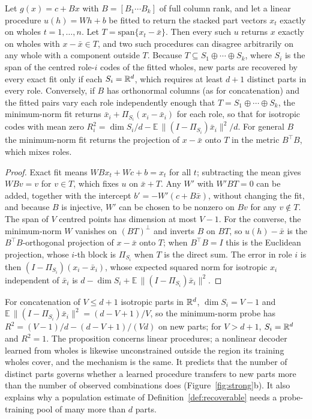\begin{proposition}
\label{prop:span}
Let $g(x) = c + Bx$ with $B = [B_1 \cdots B_k]$ of full column rank, and let a linear procedure $u(h) = Wh + b$ be fitted to return the stacked part vectors $x_t$ exactly on wholes $t = 1, \ldots, n$. Let $T = \mathrm{span}\{x_t - \bar{x}\}$. Then every such $u$ returns $x$ exactly on wholes with $x - \bar{x} \in T$, and two such procedures can disagree arbitrarily on any whole with a component outside $T$. Because $T \subseteq S_1 \oplus \cdots \oplus S_k$, where $S_i$ is the span of the centred role-$i$ codes of the fitted wholes, new parts are recovered by every exact fit only if each $S_i = \mathbb{R}^d$, which requires at least $d + 1$ distinct parts in every role. Conversely, if $B$ has orthonormal columns (as for concatenation) and the fitted pairs vary each role independently enough that $T = S_1 \oplus \cdots \oplus S_k$, the minimum-norm fit returns $\bar{x}_i + \Pi_{S_i}(x_i - \bar{x}_i)$ for each role, so that for isotropic codes with mean zero $R^2_i = \dim S_i/d - \mathbb{E}\,\lVert (I - \Pi_{S_i})\bar{x}_i \rVert^2/d$. For general $B$ the minimum-norm fit returns the projection of $x - \bar{x}$ onto $T$ in the metric $B^{\top}B$, which mixes roles.
\end{proposition}

\begin{proof}
Exact fit means $WBx_t + Wc + b = x_t$ for all $t$; subtracting the mean gives $WBv = v$ for $v \in T$, which fixes $u$ on $\bar{x} + T$. Any $W'$ with $W'BT = 0$ can be added, together with the intercept $b' = -W'(c + B\bar{x})$, without changing the fit, and because $B$ is injective, $W'$ can be chosen to be nonzero on $B v$ for any $v \notin T$. The span of $V$ centred points has dimension at most $V - 1$. For the converse, the minimum-norm $W$ vanishes on $(BT)^{\perp}$ and inverts $B$ on $BT$, so $u(h) - \bar{x}$ is the $B^{\top}B$-orthogonal projection of $x - \bar{x}$ onto $T$; when $B^{\top}B = I$ this is the Euclidean projection, whose $i$-th block is $\Pi_{S_i}$ when $T$ is the direct sum. The error in role $i$ is then $(I - \Pi_{S_i})(x_i - \bar{x}_i)$, whose expected squared norm for isotropic $x_i$ independent of $\bar{x}_i$ is $d - \dim S_i + \mathbb{E}\,\lVert (I - \Pi_{S_i})\bar{x}_i \rVert^2$.
\end{proof}

\noindent
For concatenation of $V \le d + 1$ isotropic parts in $\mathbb{R}^d$, $\dim S_i = V - 1$ and $\mathbb{E}\,\lVert(I - \Pi_{S_i})\bar{x}_i\rVert^2 = (d - V + 1)/V$, so the minimum-norm probe has $R^2 = (V-1)/d - (d - V + 1)/(Vd)$ on new parts; for $V > d + 1$, $S_i = \mathbb{R}^d$ and $R^2 = 1$. The proposition concerns linear procedures; a nonlinear decoder learned from wholes is likewise unconstrained outside the region its training wholes cover, and the mechanism is the same. It predicts that the number of distinct parts governs whether a learned procedure transfers to new parts more than the number of observed combinations does (Figure~\ref{fig:strong}b). It also explains why a population estimate of Definition~\ref{def:recoverable} needs a probe-training pool of many more than $d$ parts.



